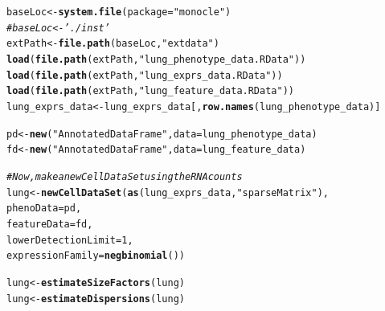 \documentclass[10pt,oneside]{article}\usepackage[]{graphicx}\usepackage[]{color}
\makeatletter
\newcommand{\hlnum}[1]{\textcolor[rgb]{0.686,0.059,0.569}{#1}}%
\newcommand{\hlstr}[1]{\textcolor[rgb]{0.192,0.494,0.8}{#1}}%
\newcommand{\hlcom}[1]{\textcolor[rgb]{0.678,0.584,0.686}{\textit{#1}}}%
\newcommand{\hlstd}[1]{\textcolor[rgb]{0.345,0.345,0.345}{#1}}%
\newcommand{\hlkwb}[1]{\textcolor[rgb]{0.69,0.353,0.396}{#1}}%
\newcommand{\hlkwc}[1]{\textcolor[rgb]{0.333,0.667,0.333}{#1}}%
\newcommand{\hlkwd}[1]{\textcolor[rgb]{0.737,0.353,0.396}{\textbf{#1}}}%
\newenvironment{kframe}{%
 \def\at@end@of@kframe{}%
 \ifinner\ifhmode%
  \def\at@end@of@kframe{\end{minipage}}%
  \begin{minipage}{\columnwidth}%
 \fi\fi%
 \def\FrameCommand##1{\hskip\@totalleftmargin \hskip-\fboxsep
 \colorbox{shadecolor}{##1}\hskip-\fboxsep
     \hskip-\linewidth \hskip-\@totalleftmargin \hskip\columnwidth}%
 \MakeFramed {\advance\hsize-\width
   \@totalleftmargin\z@ \linewidth\hsize
   \@setminipage}}%
 {\par\unskip\endMakeFramed%
 \at@end@of@kframe}
\newenvironment{knitrout}{}{} %
\makeatother
\begin{document}
\begin{knitrout}
\color{fgcolor}\begin{kframe}
\begin{alltt}
\hlstd{baseLoc} \hlkwb{<-} \hlkwd{system.file}\hlstd{(}\hlkwc{package}\hlstd{=}\hlstr{"monocle"}\hlstd{)}
\hlcom{#baseLoc <- './inst'}
\hlstd{extPath} \hlkwb{<-} \hlkwd{file.path}\hlstd{(baseLoc,} \hlstr{"extdata"}\hlstd{)}
\hlkwd{load}\hlstd{(}\hlkwd{file.path}\hlstd{(extPath,} \hlstr{"lung_phenotype_data.RData"}\hlstd{))}
\hlkwd{load}\hlstd{(}\hlkwd{file.path}\hlstd{(extPath,} \hlstr{"lung_exprs_data.RData"}\hlstd{))}
\hlkwd{load}\hlstd{(}\hlkwd{file.path}\hlstd{(extPath,} \hlstr{"lung_feature_data.RData"}\hlstd{))}
\hlstd{lung_exprs_data} \hlkwb{<-} \hlstd{lung_exprs_data[,}\hlkwd{row.names}\hlstd{(lung_phenotype_data)]}

\hlstd{pd} \hlkwb{<-} \hlkwd{new}\hlstd{(}\hlstr{"AnnotatedDataFrame"}\hlstd{,} \hlkwc{data} \hlstd{= lung_phenotype_data)}
\hlstd{fd} \hlkwb{<-} \hlkwd{new}\hlstd{(}\hlstr{"AnnotatedDataFrame"}\hlstd{,} \hlkwc{data} \hlstd{= lung_feature_data)}

\hlcom{# Now, make a new CellDataSet using the RNA counts}
\hlstd{lung} \hlkwb{<-} \hlkwd{newCellDataSet}\hlstd{(}\hlkwd{as}\hlstd{(lung_exprs_data,} \hlstr{"sparseMatrix"}\hlstd{),}
                       \hlkwc{phenoData} \hlstd{= pd,}
                       \hlkwc{featureData} \hlstd{= fd,}
                       \hlkwc{lowerDetectionLimit}\hlstd{=}\hlnum{1}\hlstd{,}
                       \hlkwc{expressionFamily}\hlstd{=}\hlkwd{negbinomial}\hlstd{())}

\hlstd{lung} \hlkwb{<-} \hlkwd{estimateSizeFactors}\hlstd{(lung)}
\hlstd{lung} \hlkwb{<-} \hlkwd{estimateDispersions}\hlstd{(lung)}


\end{alltt}
\end{kframe}
\end{knitrout}
\end{document}
